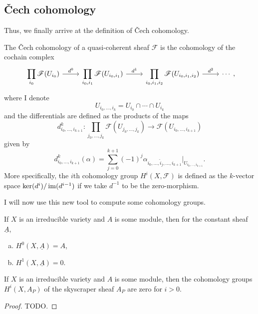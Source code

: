 \subsection{\v Cech cohomology}
Thus, we finally arrive at the definition of \v Cech cohomology.
\begin{defin}\label{def:cech}
  The \v Cech cohomology of a quasi-coherent sheaf $\mathscr{F}$ is the
  cohomology of the cochain complex
  \[\begin{tikzcd}
      \displaystyle\prod_{i_{0}}\mathscr{F}(U_{i_{0}})\rar{d^{0}}
      & \displaystyle\prod_{i_{0},i_{1}}\mathscr{F}(U_{i_{0},i_{1}})\rar{d^{1}}
      & \displaystyle\prod_{i_{0},i_{1},i_{2}}\mathscr{F}(U_{i_{0},i_{1},i_{2}})\rar{d^{2}}
      & \cdots
    \end{tikzcd},\]
  where I denote
  \[U_{i_{0},\ldots, i_{k}}=U_{i_{0}}\cap\cdots\cap U_{i_{k}}\]
  and the differentials are defined as the products of the maps
  \[d_{i_{0},\ldots,i_{k+1}}^{k}:\displaystyle\prod_{j_{0},\ldots,j_{k}}
  \mathscr{F}(U_{j_{0},\ldots,j_{k}})\to \mathscr{F}(U_{i_{0},\ldots,i_{k+1}})\]
  given by
  \[
    d_{i_{0},\ldots,i_{k+1}}^{k}(\alpha)
    =\sum_{j=0}^{k+1}(-1)^{j}\alpha_{i_{0},\ldots,\hat{i}_{j},\ldots,i_{k+1}}
    \vert_{U_{i_{0},\ldots,i_{k+1}}}.
  \]
  More specifically, the $i$th cohomology group $H^{i}(X,\mathscr{F})$
  is defined as the $k$-vector space $\ker(d^{i})/\operatorname{im}(d^{i-1})$ if we
  take $d^{-1}$ to be the zero-morphism.
\end{defin}
I will now use this new tool to compute some cohomology groups.
\begin{prop}\label{prop:const_sheaf}
  If $X$ is an irreducible variety and $A$ is some module,
  then for the constant sheaf $\underline{A}$,
  \begin{enumerate}[(a)]
    \item $H^{0}(X,\underline{A}) = A$,
    \item $H^{1}(X,\underline{A})=0$.
  \end{enumerate}
\end{prop}

\begin{prop}\label{prop:sky_cohom}
  If $X$ is an irreducible variety and $A$ is some module,
  then the cohomology groups $H^{i}(X,A_{P})$ of the skyscraper sheaf
  $A_{P}$ are zero for $i>0$.
\end{prop}
\begin{proof}
  TODO.
\end{proof}
